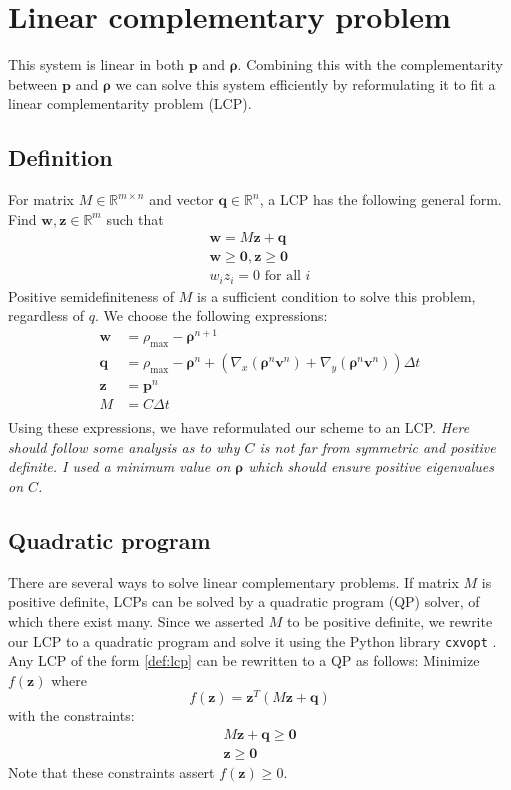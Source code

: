 \documentclass{article}
\renewcommand{\vec}[1]{\mathbf{#1}}
\newcommand{\gvec}[1]{\boldsymbol#1}
\begin{document}
\section{Linear complementary problem}
\label{sec:lcp}
This system is linear in both $\vec{p}$ and $\gvec{\rho}$. Combining this with the complementarity between $\vec{p}$ and $\gvec{\rho}$ we can solve this system efficiently by reformulating it to fit a linear complementarity problem (LCP).
\subsection{Definition}
For matrix $M \in \mathbb{R}^{m\times n}$ and vector $\vec{q}\in \mathbb{R}^n$, a LCP has the following general form. Find $\vec{w},\vec{z}\in \mathbb{R}^m$ such that
\begin{align}
	\vec{w}=M\vec{z}+\vec{q}\\
	\vec{w}\geq\vec{0},\vec{z}\geq\vec{0}\\
w_iz_i=0\mbox{ for all }i
\label{def:lcp}
\end{align}
Positive semidefiniteness of $M$ is a sufficient condition to solve this problem, regardless of $q$.
We choose the following expressions:
\begin{align}
	\vec{w} &= \rho_{\max}-\gvec{\rho}^{n+1}\\
	\vec{q} &= \rho_{\max}-\gvec{\rho}^n+\left(\nabla_x(\gvec{\rho}^n\vec{v}^n)+\nabla_y(\gvec{\rho}^n\vec{v}^n)\right)\Delta t\\
	\vec{z} &= \vec{p}^n\\
	M &= C\Delta t\\
	\label{eq:lcp}
\end{align}
Using these expressions, we have reformulated our scheme to an LCP.
\emph{Here should follow some analysis as to why $C$ is not far from symmetric and positive definite. I used a minimum value on $\gvec{\rho}$ which should ensure positive eigenvalues on $C$.}
\subsection{Quadratic program}
There are several ways to solve linear complementary problems. If  matrix $M$ is positive definite, LCPs can be solved by a quadratic program (QP) solver, of which there exist many. Since we asserted $M$ to be positive definite, we rewrite our LCP to a quadratic program and solve it using the Python library \texttt{cxvopt} \cite{cvxopt}.
\ \\
Any LCP of the form \eqref{def:lcp} can be rewritten to a QP as follows: Minimize $f(\vec{z})$ where
\begin{equation}
	f(\vec{z}) = \vec{z}^T\left( M\vec{z}+\vec{q} \right)
\end{equation}
with the constraints:
\begin{align}
	M\vec{z} + \vec{q}\geq\vec{0}\\
	\vec{z}\geq\vec{0}
\end{align}
Note that these constraints assert $f(\vec{z}) \geq 0$. 
\end{document}
